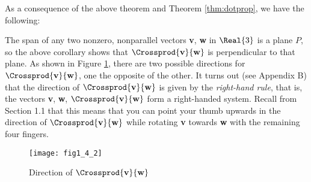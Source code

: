 As a consequence of the above theorem and Theorem \ref{thm:dotprop}, we have the following:


The span of any two nonzero, nonparallel vectors \textbf{v}, \textbf{w} in $\Real{3}$ is a plane $P$, so the above
corollary shows that $\Crossprod{\textbf{v}}{\textbf{w}}$ is perpendicular to that plane. As shown in
Figure \ref{fig:crossnormal}, there are two possible directions for $\Crossprod{\textbf{v}}{\textbf{w}}$, one the
opposite of the other.
It turns out (see Appendix B) that the direction of $\Crossprod{\textbf{v}}{\textbf{w}}$
is given by the \emph{right-hand rule}, that is, the vectors \textbf{v}, \textbf{w},
$\Crossprod{\textbf{v}}{\textbf{w}}$ form a right-handed system. Recall from Section 1.1 that this means that
you can point your thumb upwards in the direction of $\Crossprod{\textbf{v}}{\textbf{w}}$
while rotating \textbf{v} towards \textbf{w} with the remaining four fingers.

\begin{figure}[h]
 \begin{center}
  \texttt{[image: fig1\_4\_2]}\vspace{-5mm}
 \end{center}
 \caption[]{\quad Direction of $\Crossprod{\textbf{v}}{\textbf{w}}$}
 \label{fig:crossnormal}
\end{figure}

